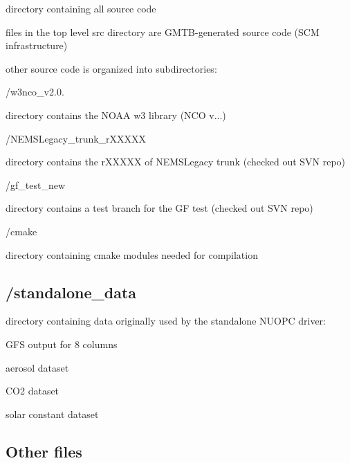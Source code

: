 \begin{DoxyItemize}
\item directory containing all source code
\begin{DoxyItemize}
\item files in the top level src directory are G\+M\+T\+B-\/generated source code (S\+CM infrastructure)
\item other source code is organized into subdirectories\+:
\begin{DoxyItemize}
\item /w3nco\+\_\+v2.0.
\begin{DoxyItemize}
\item directory contains the N\+O\+AA w3 library (N\+CO v...)
\end{DoxyItemize}
\item /\+N\+E\+M\+S\+Legacy\+\_\+trunk\+\_\+r\+X\+X\+X\+XX
\begin{DoxyItemize}
\item directory contains the r\+X\+X\+X\+XX of N\+E\+M\+S\+Legacy trunk (checked out S\+VN repo)
\end{DoxyItemize}
\item /gf\+\_\+test\+\_\+new
\begin{DoxyItemize}
\item directory contains a test branch for the GF test (checked out S\+VN repo)
\end{DoxyItemize}
\item /cmake
\begin{DoxyItemize}
\item directory containing cmake modules needed for compilation 
\end{DoxyItemize}
\end{DoxyItemize}
\end{DoxyItemize}
\end{DoxyItemize}\hypertarget{index_standalone_data}{}\subsection{/standalone\+\_\+data}\label{index_standalone_data}

\begin{DoxyItemize}
\item directory containing data originally used by the standalone N\+U\+O\+PC driver\+:
\begin{DoxyItemize}
\item G\+FS output for 8 columns
\item aerosol dataset
\item C\+O2 dataset
\item solar constant dataset 
\end{DoxyItemize}
\end{DoxyItemize}\hypertarget{index_other}{}\subsection{Other files}\label{index_other}

